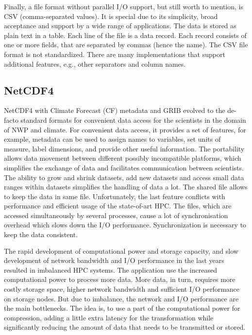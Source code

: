 \documentclass{../../template/esiwace-report}
\begin{document}

Finally, a file format without parallel I/O support, but still worth to mention, is CSV (comma-separated values).
It is special due to its simplicity, broad acceptance and support by a wide range of applications.
The data is stored as plain text in a table. 
Each line of the file is a data record. 
Each record consists of one or more fields, that are separated by commas (hence the name).
The CSV file format is not standardized.
There are many implementations that support additional features, e.g., other separators and column names.



\subsection{NetCDF4}
NetCDF4 with Climate Forecast (CF) metadata and GRIB evolved to the de-facto standard formats for  convenient data access for the scientists in the domain of NWP and climate.
For convenient data access, it provides a set of features, for example, metadata can be used to assign names to variables, set units of measure, label dimensions, and provide other useful information.
The portability allows data movement between different possibly incompatible platforms, which simplifies the exchange of data and facilitates communication between scientists.
The ability to grow and shrink datasets, add new datasets and access small data ranges within datasets simplifies the handling of data a lot.
The shared file allows to keep the data in same file.
Unfortunately, the last feature conflicts with performance and efficient usage of the state-of-art HPC.
The files, which are accessed simultaneously by several processes, cause a lot of synchronisation overhead which slows down the I/O performance.
Synchronization is necessary to keep the data consistent.

The rapid development of computational power and storage capacity, and slow development of network bandwidth and I/O performance in the last years resulted in imbalanced HPC systems.
The application use the increased computational power to process more data.
More data, in turn, requires more costly storage space, higher network bandwidth and sufficient I/O performance on storage nodes.
But due to imbalance, the network and I/O performance are the main bottlenecks.
The idea is, to use a part of the computational power for compression, adding a little extra latency for the transformation while significantly reducing the amount of data that needs to be transmitted or stored.
\end{document}
